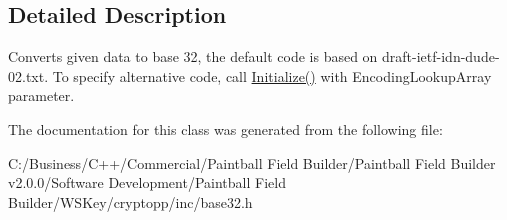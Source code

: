 \subsection{Detailed Description}
Converts given data to base 32, the default code is based on draft-\/ietf-\/idn-\/dude-\/02.txt. To specify alternative code, call \hyperlink{class_filter_a0c011bdc71755b373292e7a722e9e332}{Initialize()} with EncodingLookupArray parameter. 

The documentation for this class was generated from the following file:\begin{DoxyCompactItemize}
\item 
C:/Business/C++/Commercial/Paintball Field Builder/Paintball Field Builder v2.0.0/Software Development/Paintball Field Builder/WSKey/cryptopp/inc/base32.h\end{DoxyCompactItemize}
